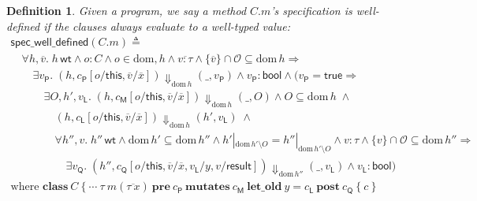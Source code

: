 \documentclass{article}
\newtheorem{definition}{Definition}
\begin{document}
\begin{definition}
Given a program, we say a method $C.m$'s specification is \emph{well-defined} if the clauses always evaluate to a well-typed value:
$$\begin{array}{l}
\mathsf{spec\_well\_defined}(C.m) \triangleq\\
\quad \forall h, \overline{v}.\;h\,\mathsf{wt} \land o : C \land o \in \mathrm{dom},h \land \overline{v : \tau} \land \{\overline{v}\} \cap \mathcal{O} \subseteq \mathrm{dom}\,h \Rightarrow\\
\quad\quad \exists v_\mathsf{P}.\;(h, c_\mathsf{P}[o/\mathsf{this},\overline{v}/\overline{x}]) \Downarrow_{\mathrm{dom}\,h} (\_, v_\mathsf{P}) \land v_\mathsf{P} : \mathsf{bool} \land
(v_\mathsf{P} = \mathsf{true} \Rightarrow\\
\quad\quad\quad \exists O, h', v_\mathsf{L}.\;(h, c_\mathsf{M}[o/\mathsf{this},\overline{v}/\overline{x}]) \Downarrow_{\mathrm{dom}\,h} (\_, O) \land O \subseteq \mathrm{dom}\,h\; \land\\
\quad\quad\quad\quad (h, c_\mathsf{L}[o/\mathsf{this},\overline{v}/\overline{x}]) \Downarrow_{\mathrm{dom}\,h} (h', v_\mathsf{L})\; \land\\
\quad\quad\quad\quad \forall h'', v.\;h''\,\mathsf{wt} \land \mathrm{dom}\,h' \subseteq \mathrm{dom}\,h'' \land h'|_{\mathrm{dom}\,h'\setminus O} = h''|_{\mathrm{dom}\,h'\setminus O} \land v : \tau \land \{v\} \cap \mathcal{O} \subseteq \mathrm{dom}\,h'' \Rightarrow\\
\quad\quad\quad\quad\quad \exists v_\mathsf{Q}.\;(h'', c_\mathsf{Q}[o/\mathsf{this}, \overline{v}/\overline{x}, v_\mathsf{L}/y, v/\mathsf{result}]) \Downarrow_{\mathrm{dom}\,h''} (\_, v_\mathsf{L}) \land v_\mathsf{L} : \mathsf{bool})\\
\textrm{where $\mathbf{class}\ C\ \{\ \cdots\ \tau\ m(\overline{\tau\ x})\ \mathbf{pre}\ c_\mathsf{P}\ \mathbf{mutates}\ c_\mathsf{M}\ \mathbf{let\_old}\ y = c_\mathsf{L}\ \mathbf{post}\ c_\mathsf{Q}\ \{\ c\ \}$}
\end{array}$$
\end{definition}
\end{document}
